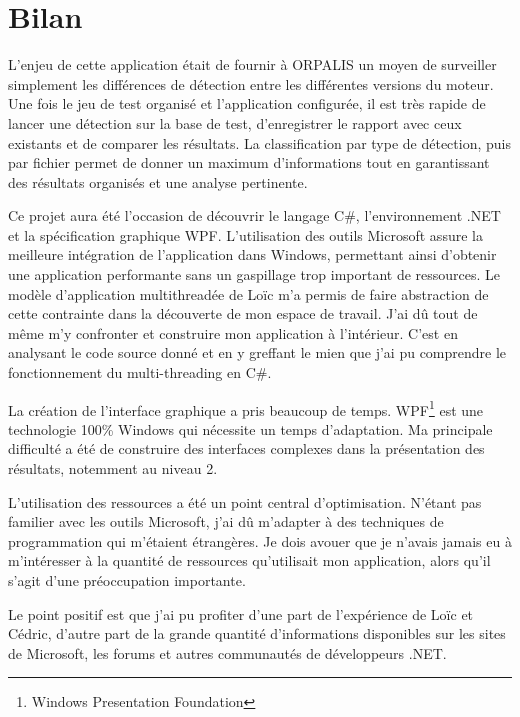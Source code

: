 \clearpage
\section{Bilan}

L'enjeu de cette application était de fournir à ORPALIS un moyen de surveiller simplement les différences de détection entre les différentes versions du moteur. Une fois le jeu de test organisé et l'application configurée, il est très rapide de lancer une détection sur la base de test, d'enregistrer le rapport avec ceux existants et de comparer les résultats. La classification par type de détection, puis par fichier permet de donner un maximum d'informations tout en garantissant des résultats organisés et une analyse pertinente.

Ce projet aura été l'occasion de découvrir le langage C\#, l'environnement .NET et la spécification graphique WPF. L'utilisation des outils Microsoft assure la meilleure intégration de l'application dans Windows, permettant ainsi d'obtenir une application performante sans un gaspillage trop important de ressources. Le modèle d'application multithreadée de Loïc m'a permis de faire abstraction de cette contrainte dans la découverte de mon espace de travail. J'ai dû tout de même m'y confronter et construire mon application à l'intérieur. C'est en analysant le code source donné et en y greffant le mien que j'ai pu comprendre le fonctionnement du multi-threading en C\#.

La création de l'interface graphique a pris beaucoup de temps. WPF\footnote{Windows Presentation Foundation} est une technologie 100\% Windows qui nécessite un temps d'adaptation. Ma principale difficulté a été de construire des interfaces complexes dans la présentation des résultats, notemment au niveau 2.

L'utilisation des ressources a été un point central d'optimisation. N'étant pas familier avec les outils Microsoft, j'ai dû m'adapter à des techniques de programmation qui m'étaient étrangères. Je dois avouer que je n'avais jamais eu à m'intéresser à la quantité de ressources qu'utilisait mon application, alors qu'il s'agit d'une préoccupation importante.

Le point positif est que j'ai pu profiter d'une part de l'expérience de Loïc et Cédric, d'autre part de la grande quantité d'informations disponibles sur les sites de Microsoft, les forums et autres communautés de développeurs .NET.